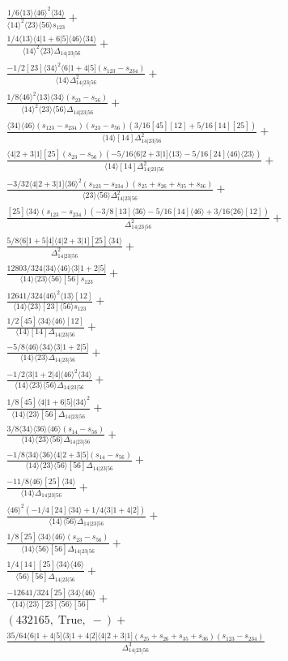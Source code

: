 \documentclass[varwidth, border=5pt]{standalone}
\begin{document}
\begin{my}
$\begin{gathered}
\scriptscriptstyle\frac{1/6⟨13⟩⟨46⟩^2⟨34⟩}{⟨14⟩^2⟨23⟩⟨56⟩s_{123}}+\\
\scriptscriptstyle\frac{1/4⟨13⟩⟨4|1+6|5]⟨46⟩⟨34⟩}{⟨14⟩^2⟨23⟩Δ_{14|23|56}}+\\
\scriptscriptstyle\frac{-1/2[23]⟨34⟩^2⟨6|1+4|5](s_{123}-s_{234})}{⟨14⟩Δ_{14|23|56}^2}+\\
\scriptscriptstyle\frac{1/8⟨46⟩^2⟨13⟩⟨34⟩(s_{23}-s_{56})}{⟨14⟩^2⟨23⟩⟨56⟩Δ_{14|23|56}}+\\
\scriptscriptstyle\frac{⟨34⟩⟨46⟩(s_{123}-s_{234})(s_{23}-s_{56})(3/16[45][12]+5/16[14][25])}{⟨14⟩[14]Δ_{14|23|56}^2}+\\
\scriptscriptstyle\frac{⟨4|2+3|1][25](s_{23}-s_{56})(-5/16⟨6|2+3|1]⟨13⟩-5/16[24]⟨46⟩⟨23⟩)}{⟨14⟩[14]Δ_{14|23|56}^2}+\\
\scriptscriptstyle\frac{-3/32⟨4|2+3|1]⟨36⟩^2(s_{123}-s_{234})(s_{25}+s_{26}+s_{35}+s_{36})}{⟨23⟩⟨56⟩Δ_{14|23|56}^2}+\\
\scriptscriptstyle\frac{[25]⟨34⟩(s_{123}-s_{234})(-3/8[13]⟨36⟩-5/16[14]⟨46⟩+3/16⟨26⟩[12])}{Δ_{14|23|56}^2}+\\
\scriptscriptstyle\frac{5/8⟨6|1+5|4]⟨4|2+3|1][25]⟨34⟩}{Δ_{14|23|56}^2}+\\
\scriptscriptstyle\frac{12803/324⟨34⟩⟨46⟩⟨3|1+2|5]}{⟨14⟩⟨23⟩⟨56⟩[56]s_{123}}+\\
\scriptscriptstyle\frac{12641/324⟨46⟩^2⟨13⟩[12]}{⟨14⟩⟨23⟩[23]⟨56⟩s_{123}}+\\
\scriptscriptstyle\frac{1/2[45]⟨34⟩⟨46⟩[12]}{⟨14⟩[14]Δ_{14|23|56}}+\\
\scriptscriptstyle\frac{-5/8⟨46⟩⟨34⟩⟨3|1+2|5]}{⟨14⟩⟨23⟩Δ_{14|23|56}}+\\
\scriptscriptstyle\frac{-1/2⟨3|1+2|4]⟨46⟩^2⟨34⟩}{⟨14⟩⟨23⟩⟨56⟩Δ_{14|23|56}}+\\
\scriptscriptstyle\frac{1/8[45]⟨4|1+6|5]⟨34⟩^2}{⟨14⟩⟨23⟩[56]Δ_{14|23|56}}+\\
\scriptscriptstyle\frac{3/8⟨34⟩⟨36⟩⟨46⟩(s_{14}-s_{56})}{⟨14⟩⟨23⟩⟨56⟩Δ_{14|23|56}}+\\
\scriptscriptstyle\frac{-1/8⟨34⟩⟨36⟩⟨4|2+3|5](s_{14}-s_{56})}{⟨14⟩⟨23⟩⟨56⟩[56]Δ_{14|23|56}}+\\
\scriptscriptstyle\frac{-11/8⟨46⟩[25]⟨34⟩}{⟨14⟩Δ_{14|23|56}}+\\
\scriptscriptstyle\frac{⟨46⟩^2(-1/4[24]⟨34⟩+1/4⟨3|1+4|2])}{⟨14⟩⟨56⟩Δ_{14|23|56}}+\\
\scriptscriptstyle\frac{1/8[25]⟨34⟩⟨46⟩(s_{23}-s_{56})}{⟨14⟩⟨56⟩[56]Δ_{14|23|56}}+\\
\scriptscriptstyle\frac{1/4[14][25]⟨34⟩⟨46⟩}{⟨56⟩[56]Δ_{14|23|56}}+\\
\scriptscriptstyle\frac{-12641/324[25]⟨34⟩⟨46⟩}{⟨14⟩⟨23⟩[23]⟨56⟩[56]}+\\
\scriptscriptstyle(432165,\;\text{True},\;-)+\\
\scriptscriptstyle\frac{35/64⟨6|1+4|5]⟨3|1+4|2]⟨4|2+3|1](s_{25}+s_{26}+s_{35}+s_{36})(s_{123}-s_{234})}{Δ_{14|23|56}^3}\phantom{+}
\end{gathered}$
\end{my}
\end{document}
